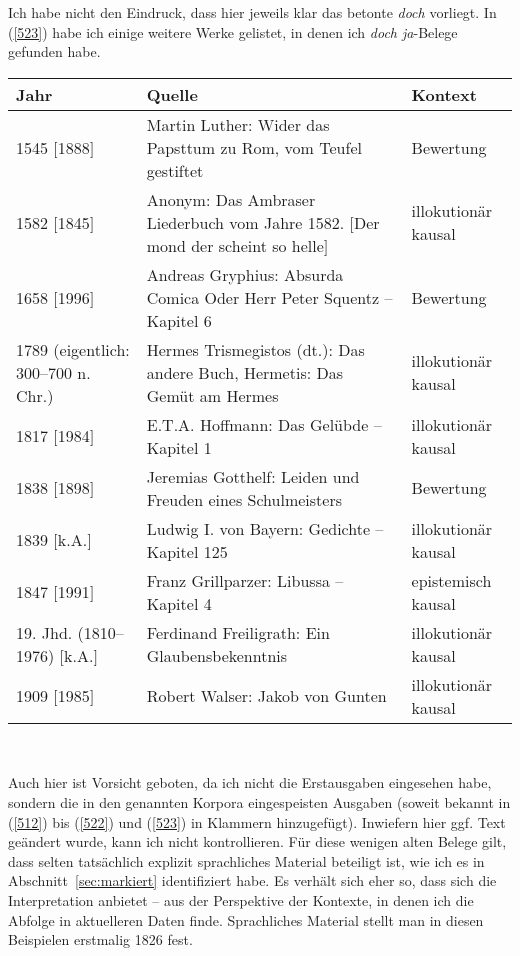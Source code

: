 Ich habe nicht den Eindruck, dass hier jeweils klar das betonte \textit{doch} vorliegt. In (\ref{523}) habe ich einige weitere Werke gelistet, in denen ich \textit{doch ja}-Belege gefunden habe.
								                        
\begin{exe}
	\ex\label{523}
	\tiny
     \begin{tabular}[t]{|p{5em}|p{18em}|p{5em}|}
     		\hline
     		Jahr & Quelle & Kontext\\
            \hline
            1545 $[$1888$]$ & Martin Luther: Wider das Papsttum zu Rom, vom Teufel gestiftet & Bewertung\\
            \hline
            1582 $[$1845$]$ & Anonym: Das Ambraser Liederbuch vom Jahre 1582. $[$Der mond der scheint so helle$]$  & 							illokutionär kausal\\
            \hline
            1658 $[$1996$]$ & Andreas Gryphius: Absurda Comica Oder Herr Peter Squentz – Kapitel 6  & Bewertung\\
            \hline
            1789 (eigentlich: 300–700 n. Chr.) & Hermes Trismegistos (dt.): Das andere Buch, Hermetis: Das Gemüt am Hermes & 					illokutionär kausal\\
            \hline
            1817 $[$1984$]$ & E.T.A. Hoffmann: Das Gelübde – Kapitel 1 & illokutionär kausal\\
            \hline
            1838 $[$1898$]$ & Jeremias Gotthelf: Leiden und Freuden eines Schulmeisters & Bewertung\\
            \hline
            1839 $[$k.A.$]$ & Ludwig I. von Bayern: Gedichte – Kapitel 125 & illokutionär kausal\\
            \hline
            1847 $[$1991$]$ & Franz Grillparzer: Libussa – Kapitel 4  & epistemisch kausal\\
            \hline
            19. Jhd. (1810–1976) $[$k.A.$]$ & Ferdinand Freiligrath: Ein Glaubensbekenntnis & illokutionär kausal\\
            \hline
            1909 $[$1985$]$ & Robert Walser: Jakob von Gunten & illokutionär kausal\\             
            \hline
      \end{tabular}\\
\end{exe}
Auch hier ist Vorsicht geboten, da ich nicht die Erstausgaben eingesehen habe, sondern die in den genannten Korpora eingespeisten Ausgaben (soweit bekannt in (\ref{512}) bis (\ref{522}) und (\ref{523}) in Klammern hinzugefügt). Inwiefern hier ggf. Text geändert wurde, kann ich nicht kontrollieren. Für diese wenigen alten Belege gilt, dass selten tatsächlich explizit sprachliches Material beteiligt ist, wie ich es in Abschnitt~\ref{sec:markiert} identifiziert habe. Es verhält sich eher so, dass sich die Interpretation anbietet – aus der Perspektive der Kontexte, in denen ich die Abfolge in aktuelleren Daten finde. Sprachliches Material stellt man in diesen Beispielen erstmalig 1826 fest. 

